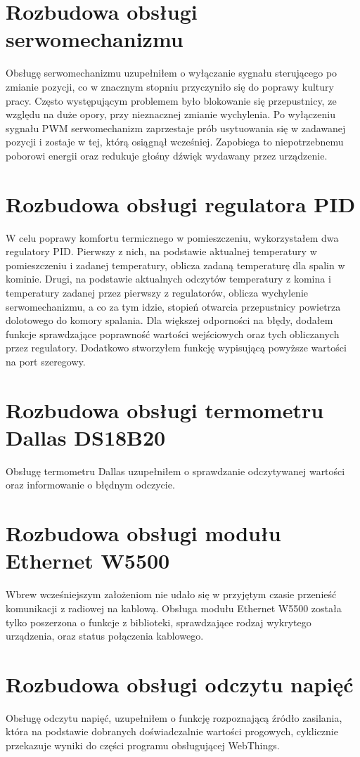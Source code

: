 \documentclass[11pt]{report}
\begin{document}
 \section{Rozbudowa obsługi serwomechanizmu}
 Obsługę serwomechanizmu uzupełniłem o wyłączanie sygnału sterującego po zmianie pozycji, co w znacznym stopniu przyczyniło się do poprawy kultury pracy. Często występującym problemem było blokowanie się przepustnicy, ze względu na duże opory, przy nieznacznej zmianie wychylenia. Po wyłączeniu sygnału PWM serwomechanizm zaprzestaje prób usytuowania się w zadawanej pozycji i zostaje w tej, którą osiągnął wcześniej. Zapobiega to niepotrzebnemu poborowi energii oraz redukuje głośny dźwięk wydawany przez urządzenie.

 \section{Rozbudowa obsługi regulatora PID}
 W celu poprawy komfortu termicznego w pomieszczeniu, wykorzystałem dwa regulatory PID. Pierwszy z nich, na podstawie aktualnej temperatury w pomieszczeniu i zadanej temperatury, oblicza zadaną temperaturę dla spalin w kominie. Drugi, na podstawie aktualnych odczytów temperatury z komina i temperatury zadanej przez pierwszy z regulatorów, oblicza wychylenie serwomechanizmu, a co za tym idzie, stopień otwarcia przepustnicy powietrza dolotowego do komory spalania.
 Dla większej odporności na błędy, dodałem funkcje sprawdzające poprawność wartości wejściowych oraz tych obliczanych przez regulatory. Dodatkowo stworzyłem funkcję wypisującą powyższe wartości na port szeregowy.

 \section{Rozbudowa obsługi termometru Dallas DS18B20}
 Obsługę termometru Dallas uzupełniłem o sprawdzanie odczytywanej wartości oraz informowanie o błędnym odczycie.

 \section{Rozbudowa obsługi modułu Ethernet W5500}
 Wbrew wcześniejszym założeniom nie udało się w przyjętym czasie przenieść komunikacji z radiowej na kablową. Obsługa modułu Ethernet W5500 została tylko poszerzona o funkcje z biblioteki, sprawdzające rodzaj wykrytego urządzenia, oraz status połączenia kablowego.
 
 \section{Rozbudowa obsługi odczytu napięć}
 Obsługę odczytu napięć, uzupełniłem o funkcję rozpoznającą źródło zasilania, która na podstawie dobranych doświadczalnie wartości progowych, cyklicznie przekazuje wyniki do części programu obsługującej WebThings.
 
\end{document}

